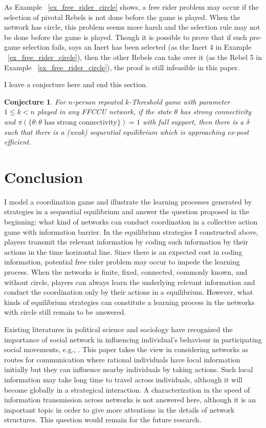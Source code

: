 \documentclass[12pt,letter]{article}
\newtheorem{conjecture}{Conjecture}[section]
\theoremstyle{definition}
\theoremstyle{remark}
\theoremstyle{claim}
\begin{document}
As Example ~\ref{ex_free_rider_circle} shows, a free rider problem may occur if the selection of pivotal Rebels is not done before the game is played. When the network has circle, this problem seems more harsh and the selection rule may not be done before the game is played. Though it is possible to prove that if such pre-game selection fails, says an Inert has been selected (as the Inert 4 in Example ~\ref{ex_free_rider_circle}), then the other Rebels can take over it (as the Rebel 5 in Example ~\ref{ex_free_rider_circle}), the proof is still infeasible in this paper. 

I leave a conjecture here and end this section.

\begin{conjecture}
\label{thm_main_result}
For $n$-person repeated $k$-Threshold game with parameter $1\leq k < n$ played in any FFCCU network,
if the state $\theta$ has strong connectivity and $\pi(\{\theta: \theta\text{ has strong connectivity}\})=1$ with full support, then there is a $\delta$ such that there is a (weak) sequential equilibrium which is approaching ex-post efficient.
\end{conjecture}



\section{Conclusion}
\label{sec:con}

I model a coordination game and illustrate the learning processes generated by strategies in a sequential equilibrium and answer the question proposed in the beginning: what kind of networks can conduct coordination in a collective action game with information barrier. In the equilibrium strategies I constructed above, players transmit the relevant information by coding such information by their actions in the time horizontal line. Since there is an expected cost in coding information, potential free rider problem may occur to impede the learning process. When the networks is finite, fixed, connected, commonly known, and without circle, players can always learn the underlying relevant information and conduct the coordination only by their actions in a equilibrium. However, what kinds of equilibrium strategies can constitute a learning process in the networks with circle still remain to be answered.

Existing literatures in political science and sociology have recognized the importance of social network in influencing individual's behaviour in participating social movements, e.g., \citep{Passy2003}\citep{McAdam2003}\citep{Siegel2009}. This paper takes the view in considering networks as routes for communication where rational individuals have local information initially but they can influence nearby individuals by taking actions. Such local information may take long time to travel across individuals, although it will become globally in a strategical interaction. A characterization in the speed of information transmission across networks is not answered here, although it is an important topic in order to give more attentions in the details of network structures. This question would remain for the future research.
\end{document}
